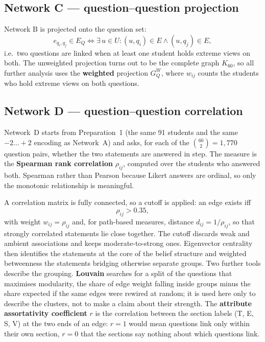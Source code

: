 \documentclass[11pt, a4paper]{article}
\begin{document}
\subsection{Network C --- question--question projection}

Network B is projected onto the question set:
$$e_{q_i,q_j} \in E_Q \iff \exists\, u \in U : (u,q_i) \in E \wedge (u,q_j) \in E,$$
i.e.\ two questions are linked when at least one student holds extreme views on both. The unweighted projection
turns out to be the complete graph $K_{60}$, so all further analysis uses the \textbf{weighted} projection
$G_Q^W$, where $w_{ij}$ counts the students who hold extreme views on both questions.

\subsection{Network D --- question--question correlation}

Network~D starts from Preparation~1 (the same 91 students and the same $-2 \dots +2$ encoding as Network~A) and
asks, for each of the $\binom{60}{2} = 1{,}770$ question pairs, whether the two statements are answered in step.
The measure is the \textbf{Spearman rank correlation} $\rho_{ij}$, computed over the students who answered both.
Spearman rather than Pearson because Likert answers are ordinal, so only the monotonic relationship is
meaningful.

A correlation matrix is fully connected, so a cutoff is applied: an edge exists iff
$$\rho_{ij} > 0.35,$$
with weight $w_{ij} = \rho_{ij}$ and, for path-based measures, distance $d_{ij} = 1/\rho_{ij}$, so that strongly
correlated statements lie close together. The cutoff discards weak and ambient associations and keeps
moderate-to-strong ones. Eigenvector centrality then identifies the statements at the core of the belief
structure and weighted betweenness the statements bridging otherwise separate groups. Two further tools
describe the grouping. \textbf{Louvain} searches for a split of the questions that maximises modularity, the
share of edge weight falling inside groups minus the share expected if the same edges were rewired at random;
it is used here only to describe the clusters, not to make a claim about their strength. The \textbf{attribute
assortativity coefficient} $r$ is the correlation between the section labels (T, E, S, V) at the two ends of an
edge: $r = 1$ would mean questions link only within their own section, $r = 0$ that the sections say nothing
about which questions link.
\end{document}
